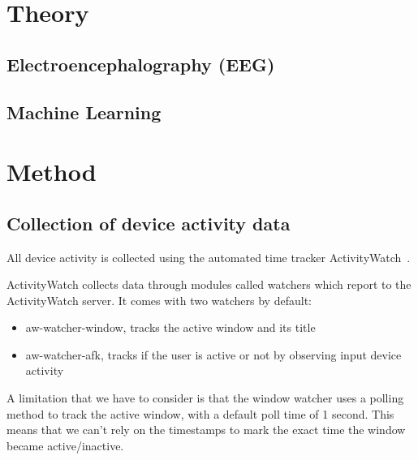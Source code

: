 \documentclass[a4paper]{article}
\begin{document}
\begin{refsection}

\section{Theory}

    \subsection{Electroencephalography (EEG)}


    \subsection{Machine Learning}


\section{Method}

    \subsection{Collection of device activity data}

        All device activity is collected using the automated time tracker ActivityWatch~\cite{bjareholt_activitywatch_2020-1}.

        ActivityWatch collects data through modules called watchers which report to the ActivityWatch server. It comes with two watchers by default:

        \begin{itemize}
            \item aw-watcher-window, tracks the active window and its title
            \item aw-watcher-afk, tracks if the user is active or not by observing input device activity
        \end{itemize}

        A limitation that we have to consider is that the window watcher uses a polling method to track the active window, with a default poll time of 1 second. This means that we can't rely on the timestamps to mark the exact time the window became active/inactive.


\end{refsection}
\end{document}
